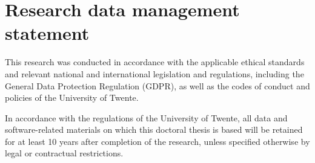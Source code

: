 \section{Research data management statement}
This research was conducted in accordance with the applicable ethical standards and relevant national and international legislation and regulations, including the General Data Protection Regulation (GDPR), as well as the codes of conduct and policies of the University of Twente.
\par 
In accordance with the regulations of the University of Twente, all data and software-related materials on which this doctoral thesis is based will be retained for at least 10 years after completion of the research, unless specified otherwise by legal or contractual restrictions.
